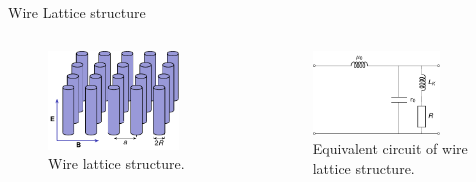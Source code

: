 \begin{frame}{Wire Lattice structure}
\begin{columns}
        \vspace{-14mm}
        \begin{figure}
            \centering
            \includegraphics[width=0.8\textwidth]{Figures/Wire_lattice_structure.pdf}
            \caption{Wire lattice structure.}
            \label{fig:Wire_lattice_structure}
        \end{figure}
        \vspace{-8mm}
        \begin{figure}
            \centering
            \includegraphics[width=0.8\textwidth]{Figures/TL_negative_permittivity.pdf}
            \caption{Equivalent circuit of wire lattice structure.}
            \label{fig:TL_negative_permittivity}
        \end{figure}
        
    \end{columns}
\end{frame}